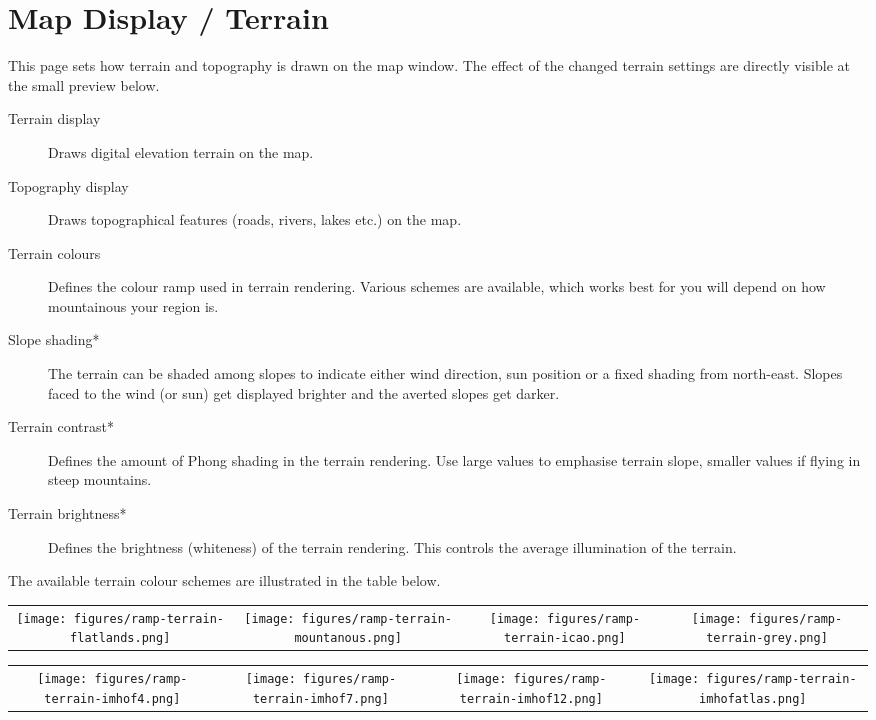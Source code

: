 \section{Map Display / Terrain}\label{sec:terrain-display}

This page sets how terrain and topography is drawn on the map window. The effect of the 
changed terrain settings are directly visible at the small preview below.

\begin{description}
\item[Terrain display]  Draws digital elevation terrain on the map.
\item[Topography display]  Draws topographical features (roads, rivers, lakes etc.) on
 the map.
\item[Terrain colours]  Defines the colour ramp used in terrain rendering.  Various 
 schemes are available, which works best for you will depend on how mountainous your region is.
\item[Slope shading*]  \label{conf:shading} The terrain can be shaded among slopes 
 to indicate either wind direction, sun position or a fixed shading from north-east. 
 Slopes faced to the wind (or sun) get displayed brighter and the averted slopes get darker.
\item[Terrain contrast*]  Defines the amount of Phong shading in the terrain rendering. 
 Use large values to emphasise terrain slope, smaller values if flying in steep mountains.
\item[Terrain brightness*]  Defines the brightness (whiteness) of the terrain rendering. 
 This controls the average illumination of the terrain.
\end{description}


The available terrain colour schemes are illustrated in the table below.

\begin{longtable}{c c c c}
\texttt{[image: figures/ramp-terrain-flatlands.png]}&
\texttt{[image: figures/ramp-terrain-mountanous.png]}&
\texttt{[image: figures/ramp-terrain-icao.png]}&
\texttt{[image: figures/ramp-terrain-grey.png]}
\end{longtable}

\begin{longtable}{c c c c}
\texttt{[image: figures/ramp-terrain-imhof4.png]}&
\texttt{[image: figures/ramp-terrain-imhof7.png]}&
\texttt{[image: figures/ramp-terrain-imhof12.png]}&
\texttt{[image: figures/ramp-terrain-imhofatlas.png]}
\end{longtable}



